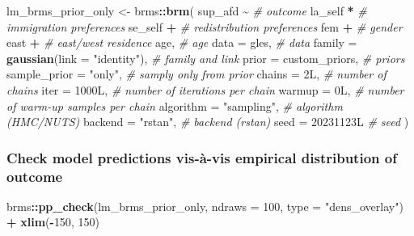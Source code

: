 \documentclass[
  11pt,
]{article}
\newenvironment{Shaded}{\begin{snugshade}}{\end{snugshade}}
\newcommand{\AttributeTok}[1]{\textcolor[rgb]{0.13,0.29,0.53}{#1}}
\newcommand{\CommentTok}[1]{\textcolor[rgb]{0.56,0.35,0.01}{\textit{#1}}}
\newcommand{\DecValTok}[1]{\textcolor[rgb]{0.00,0.00,0.81}{#1}}
\newcommand{\FunctionTok}[1]{\textcolor[rgb]{0.13,0.29,0.53}{\textbf{#1}}}
\newcommand{\NormalTok}[1]{#1}
\newcommand{\OtherTok}[1]{\textcolor[rgb]{0.56,0.35,0.01}{#1}}
\newcommand{\SpecialCharTok}[1]{\textcolor[rgb]{0.81,0.36,0.00}{\textbf{#1}}}
\newcommand{\StringTok}[1]{\textcolor[rgb]{0.31,0.60,0.02}{#1}}
\begin{document}
\begin{Shaded}
\begin{Highlighting}[]
\NormalTok{lm\_brms\_prior\_only }\OtherTok{\textless{}{-}}\NormalTok{ brms}\SpecialCharTok{::}\FunctionTok{brm}\NormalTok{(}
\NormalTok{  sup\_afd }\SpecialCharTok{\textasciitilde{}}                              \CommentTok{\# outcome}
\NormalTok{    la\_self }\SpecialCharTok{*}                            \CommentTok{\# immigration preferences}
\NormalTok{    se\_self }\SpecialCharTok{+}                            \CommentTok{\# redistribution preferences}
\NormalTok{    fem }\SpecialCharTok{+}                                \CommentTok{\# gender}
\NormalTok{    east }\SpecialCharTok{+}                               \CommentTok{\# east/west residence}
\NormalTok{    age,                                 }\CommentTok{\# age}
  \AttributeTok{data =}\NormalTok{ gles,                           }\CommentTok{\# data}
  \AttributeTok{family =} \FunctionTok{gaussian}\NormalTok{(}\AttributeTok{link =} \StringTok{"identity"}\NormalTok{),  }\CommentTok{\# family and link}
  \AttributeTok{prior =}\NormalTok{ custom\_priors,                 }\CommentTok{\# priors}
  \AttributeTok{sample\_prior =} \StringTok{"only"}\NormalTok{,                 }\CommentTok{\# samply only from prior}
  \AttributeTok{chains =}\NormalTok{ 2L,                           }\CommentTok{\# number of chains}
  \AttributeTok{iter =}\NormalTok{ 1000L,                          }\CommentTok{\# number of iterations per chain}
  \AttributeTok{warmup =}\NormalTok{ 0L,                           }\CommentTok{\# number of warm{-}up samples per chain}
  \AttributeTok{algorithm =} \StringTok{"sampling"}\NormalTok{,                }\CommentTok{\# algorithm (HMC/NUTS)}
  \AttributeTok{backend =} \StringTok{"rstan"}\NormalTok{,                     }\CommentTok{\# backend (rstan)}
  \AttributeTok{seed =}\NormalTok{ 20231123L                       }\CommentTok{\# seed}
\NormalTok{)}
\end{Highlighting}
\end{Shaded}

\hypertarget{check-model-predictions-vis-uxe0-vis-empirical-distribution-of-outcome}{%
\subsubsection{Check model predictions vis-à-vis empirical distribution of outcome}\label{check-model-predictions-vis-uxe0-vis-empirical-distribution-of-outcome}}

\begin{Shaded}
\begin{Highlighting}[]
\NormalTok{brms}\SpecialCharTok{::}\FunctionTok{pp\_check}\NormalTok{(lm\_brms\_prior\_only, }\AttributeTok{ndraws =} \DecValTok{100}\NormalTok{, }\AttributeTok{type =} \StringTok{"dens\_overlay"}\NormalTok{) }\SpecialCharTok{+}
  \FunctionTok{xlim}\NormalTok{(}\SpecialCharTok{{-}}\DecValTok{150}\NormalTok{, }\DecValTok{150}\NormalTok{)}
\end{Highlighting}
\end{Shaded}
\end{document}
